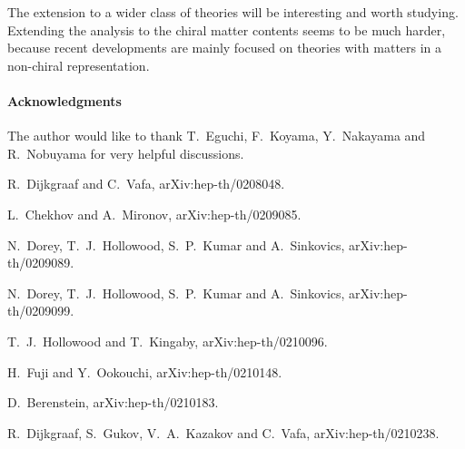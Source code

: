 \documentclass[a4paper,12pt]{article}
\begin{document}
The extension to a wider class of theories 
will be interesting and worth studying.
Extending the analysis to the chiral matter contents seems to be much harder,
because recent developments are mainly focused on theories with
matters in a non-chiral  representation.


\paragraph{Acknowledgments}
The author would like to thank T.~Eguchi, 
F.~Koyama,  Y.~Naka\-yama and R.~Nobuyama for  very helpful discussions.


\begin{thebibliography}{99}



R.~Dijkgraaf and C.~Vafa,
arXiv:hep-th/0208048.


L.~Chekhov and A.~Mironov,
arXiv:hep-th/0209085.

N.~Dorey, T.~J.~Hollowood, S.~P.~Kumar and A.~Sinkovics,
arXiv:hep-th/0209089.

N.~Dorey, T.~J.~Hollowood, S.~P.~Kumar and A.~Sinkovics,
arXiv:hep-th/0209099.




T.~J.~Hollowood and T.~Kingaby,
arXiv:hep-th/0210096.

H.~Fuji and Y.~Ookouchi,
arXiv:hep-th/0210148.

D.~Berenstein,
arXiv:hep-th/0210183.



R.~Dijkgraaf, S.~Gukov, V.~A.~Kazakov and C.~Vafa,
arXiv:hep-th/0210238.


\end{thebibliography}
\end{document}
